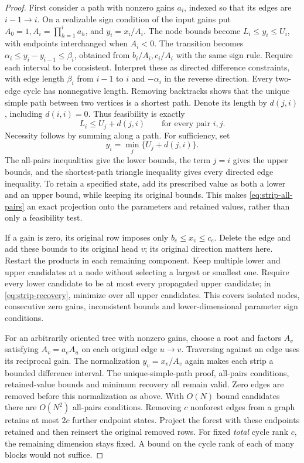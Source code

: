\begin{proof}
First consider a path with nonzero gains \(a_i\), indexed so that its edges are
\(i-1\to i\). On a realizable sign condition of the input gains put
\(A_0=1,A_i=\prod_{h=1}^i a_h\), and \(y_i=x_i/A_i\).
The node bounds become \(L_i\le y_i\le U_i\), with endpoints interchanged
when \(A_i<0\). The transition becomes
\(\alpha_i\le y_i-y_{i-1}\le\beta_i\), obtained from \(b_i/A_i,c_i/A_i\)
with the same sign rule. Require each interval to be consistent. Interpret
these as directed difference constraints, with edge length \(\beta_i\) from
\(i-1\) to \(i\) and \(-\alpha_i\) in the reverse direction. Every two-edge
cycle has nonnegative length. Removing backtracks shows that the unique
simple path between two vertices is a shortest path. Denote its length by
\(d(j,i)\), including \(d(i,i)=0\). Thus feasibility is exactly
\begin{equation}\label{eq:strip-all-pairs}
 L_i\le U_j+d(j,i)\qquad\text{for every pair }i,j.
\end{equation}
Necessity follows by summing along a path. For sufficiency, set
\begin{equation}\label{eq:strip-recovery}
 y_i=\min_j\{U_j+d(j,i)\}.
\end{equation}
The all-pairs inequalities give the lower bounds, the term \(j=i\) gives the
upper bounds, and the shortest-path triangle inequality gives every directed
edge inequality. To retain a specified state, add its prescribed value as
both a lower and an upper bound, while keeping its original bounds. This
makes \eqref{eq:strip-all-pairs} an exact projection onto the parameters and
retained values, rather than only a feasibility test.

If a gain is zero, its original row imposes only \(b_e\le x_v\le c_e\).
Delete the edge and add these bounds to its original head \(v\); its original
direction matters here. Restart the products in each remaining component.
Keep multiple lower and upper candidates at a node without selecting a
largest or smallest one. Require every lower candidate to be at most every
propagated upper candidate; in \eqref{eq:strip-recovery}, minimize over all
upper candidates. This covers isolated nodes, consecutive zero gains,
inconsistent bounds and lower-dimensional parameter sign conditions.

For an arbitrarily oriented tree with nonzero gains, choose a root and factors
\(A_v\) satisfying \(A_v=a_e A_u\) on each original edge \(u\to v\).
Traversing against an edge uses its reciprocal gain. The normalization
\(y_v=x_v/A_v\) again makes each strip a bounded difference interval.
The unique-simple-path proof, all-pairs conditions, retained-value bounds and
minimum recovery all remain valid. Zero edges are removed before this
normalization as above. With \(O(N)\) bound candidates there are \(O(N^2)\)
all-pairs conditions. Removing \(c\) nonforest edges from a graph retains at
most \(2c\) further endpoint states. Project the forest with these endpoints
retained and then reinsert the original removed rows. For fixed \emph{total}
cycle rank \(c\), the remaining dimension stays fixed. A bound on the cycle
rank of each of many blocks would not suffice.


\end{proof}
